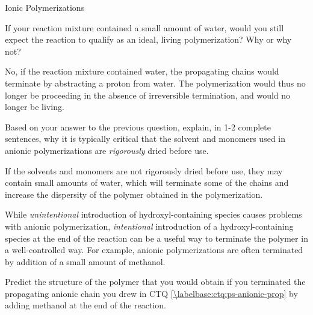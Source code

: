 \begin{activity}{Ionic Polymerizations}
\begin{ctqs}
	\question If your reaction mixture contained a small amount of water, would you still expect the reaction to qualify as an ideal, living polymerization?  Why or why not?
	
		\begin{solution}[1.25in]
			No, if the reaction mixture contained water, the propagating chains would terminate by abstracting a proton from water.  The polymerization would thus no longer be proceeding in the absence of irreversible termination, and would no longer be living.
		\end{solution}
	
	\question Based on your answer to the previous question, explain, in 1-2 complete sentences, why it is typically critical that the solvent and monomers used in anionic polymerizations are \emph{rigorously} dried before use.
	
		\begin{solution}[1.25in]
			If the solvents and monomers are not rigorously dried before use, they may contain small amounts of water, which will terminate some of the chains and increase the dispersity of the polymer obtained in the polymerization.
		\end{solution}
	
\end{ctqs}

\begin{infobox}

	While \emph{unintentional} introduction of hydroxyl-containing species causes problems with anionic polymerization, \emph{intentional} introduction of a hydroxyl-containing species at the end of the reaction can be a useful way to terminate the polymer in a well-controlled way.  For example, anionic polymerizations are often terminated by addition of a small amount of methanol.

\end{infobox}

\begin{ctqs}

	\question Predict the structure of the polymer that you would obtain if you terminated the propagating anionic chain you drew in CTQ \ref{\labelbase:ctq:ps-anionic-prop} by adding methanol at the end of the reaction.
	
		\begin{solution}[2in]
		\studentdisplay{}
		\end{solution}


\end{ctqs}
\end{activity}
